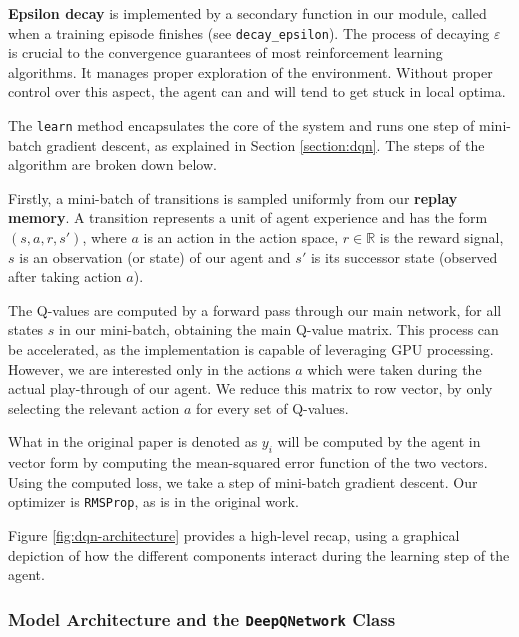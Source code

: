 \textbf{Epsilon decay} is implemented by a secondary function in our module, called when a training episode finishes (see \verb|decay_epsilon|).
The process of decaying $\varepsilon$ is crucial to the convergence guarantees of most reinforcement learning algorithms.
It manages proper exploration of the environment.
Without proper control over this aspect, the agent can and will tend to get stuck in local optima.

The \verb|learn| method encapsulates the core of the system and runs one step of mini-batch gradient descent, as explained in Section \ref{section:dqn}.
The steps of the algorithm are broken down below.

Firstly, a mini-batch of transitions is sampled uniformly from our \textbf{replay memory}.
A transition represents a unit of agent experience and has the form $(s, a, r, s')$, where $a$ is an action in the action space, $r \in \mathbb{R}$ is the reward signal, $s$ is an observation (or state) of our agent and $s'$ is its successor state (observed after taking action $a$).

The Q-values are computed by a forward pass through our main network, for all states $s$ in our mini-batch, obtaining the main Q-value matrix.
This process can be accelerated, as the implementation is capable of leveraging GPU processing.
However, we are interested only in the actions $a$ which were taken during the actual play-through of our agent.
We reduce this matrix to row vector, by only selecting the relevant action $a$ for every set of Q-values.

What in the original paper is denoted as $y_i$ will be computed by the agent in vector form by computing the mean-squared error function of the two vectors.
Using the computed loss, we take a step of mini-batch gradient descent.
Our optimizer is \verb|RMSProp|, as is in the original work.

Figure \ref{fig:dqn-architecture} provides a high-level recap, using a graphical depiction of how the different components interact during the learning step of the agent.

\subsubsection{Model Architecture and the \texttt{DeepQNetwork} Class} \label{section:model-arch}


